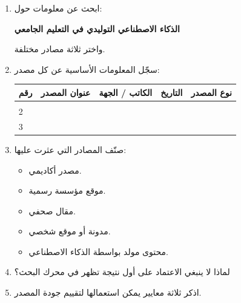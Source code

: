 \documentclass[a4paper]{article}
\begin{document}
\begin{enumerate}

\item ابحث عن معلومات حول:

\begin{center}

\textbf{
الذكاء الاصطناعي التوليدي في التعليم الجامعي
}

\end{center}

واختر ثلاثة مصادر مختلفة.


\item سجّل المعلومات الأساسية عن كل مصدر:

\begin{center}

\begin{tabular}{|
>{\centering\arraybackslash}m{1.2cm}|
>{\raggedleft\arraybackslash}m{4cm}|
>{\raggedleft\arraybackslash}m{3cm}|
>{\raggedleft\arraybackslash}m{3cm}|
>{\raggedleft\arraybackslash}m{3cm}|}

\hline

\textbf{رقم}
&
\textbf{عنوان المصدر}
&
\textbf{الكاتب / الجهة}
&
\textbf{التاريخ}
&
\textbf{نوع المصدر}
\\

\hline

1
&
&
&
&
\\[0.5cm]

\hline

2
&
&
&
&
\\[0.5cm]

\hline

3
&
&
&
&
\\[0.5cm]

\hline

\end{tabular}

\end{center}


\item صنّف المصادر التي عثرت عليها:

\begin{itemize}

    \item مصدر أكاديمي.
    \item موقع مؤسسة رسمية.
    \item مقال صحفي.
    \item مدونة أو موقع شخصي.
    \item محتوى مولد بواسطة الذكاء الاصطناعي.

\end{itemize}


\item لماذا لا ينبغي الاعتماد على أول نتيجة تظهر
في محرك البحث؟


\item اذكر ثلاثة معايير يمكن استعمالها لتقييم جودة
المصدر.

\end{enumerate}
\end{document}
